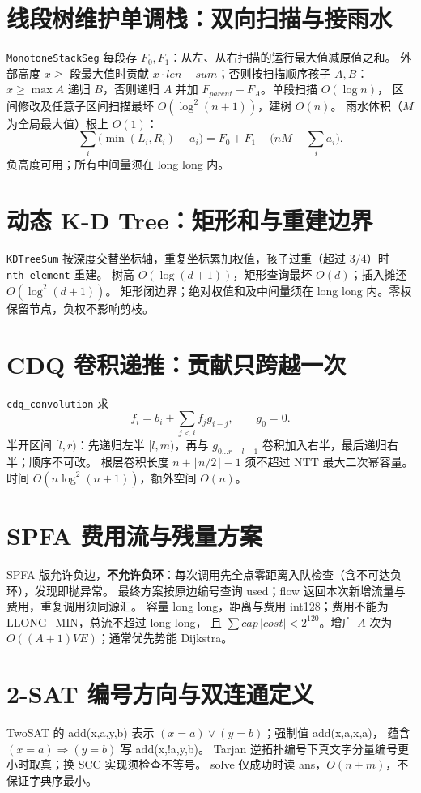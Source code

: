 \section{线段树维护单调栈：双向扫描与接雨水}\label{knowledge-seg-stack}
\texttt{MonotoneStackSeg} 每段存 $F_0,F_1$：从左、从右扫描的运行最大值减原值之和。
外部高度 $x\ge$ 段最大值时贡献 $x\cdot len-sum$；否则按扫描顺序孩子 $A,B$：
$x\ge\max A$ 递归 $B$，否则递归 $A$ 并加 $F_{parent}-F_A$。单段扫描 $O(\log n)$，
区间修改及任意子区间扫描最坏 $O(\log^2(n+1))$，建树 $O(n)$。
雨水体积（$M$ 为全局最大值）根上 $O(1)$：
\[
\sum_i\bigl(\min(L_i,R_i)-a_i\bigr)
=F_0+F_1-\bigl(nM-\sum_i a_i\bigr).
\]
负高度可用；所有中间量须在 long long 内。

\section{动态 K-D Tree：矩形和与重建边界}\label{knowledge-kdt-sum}
\texttt{KDTreeSum} 按深度交替坐标轴，重复坐标累加权值，孩子过重（超过 $3/4$）时 \texttt{nth\_element} 重建。
树高 $O(\log(d+1))$，矩形查询最坏 $O(d)$；插入摊还 $O(\log^2(d+1))$。
矩形闭边界；绝对权值和及中间量须在 long long 内。零权保留节点，负权不影响剪枝。

\section{CDQ 卷积递推：贡献只跨越一次}\label{knowledge-cdq-conv}
\texttt{cdq\_convolution} 求
\[
f_i=b_i+\sum_{j<i}f_j g_{i-j},\qquad g_0=0.
\]
半开区间 $[l,r)$：先递归左半 $[l,m)$，再与 $g_{0\ldots r-l-1}$ 卷积加入右半，最后递归右半；顺序不可改。
根层卷积长度 $n+\lfloor n/2\rfloor-1$ 须不超过 NTT 最大二次幂容量。
时间 $O(n\log^2(n+1))$，额外空间 $O(n)$。

\section{SPFA 费用流与残量方案}\label{knowledge-spfa-cost}
SPFA 版允许负边，\textbf{不允许负环}：每次调用先全点零距离入队检查（含不可达负环），发现即抛异常。
最终方案按原边编号查询 used；flow 返回本次新增流量与费用，重复调用须同源汇。
容量 long long，距离与费用 int128；费用不能为 LLONG\_MIN，总流不超过 long long，
且 $\sum cap\,|cost|<2^{120}$。增广 $A$ 次为 $O((A+1)VE)$；通常优先势能 Dijkstra。

\section{2-SAT 编号方向与双连通定义}\label{knowledge-twosat-bcc}
TwoSAT 的 add(x,a,y,b) 表示 $(x=a)\lor(y=b)$；强制值 add(x,a,x,a)，
蕴含 $(x=a)\Rightarrow(y=b)$ 写 add(x,!a,y,b)。
Tarjan 逆拓扑编号下真文字分量编号更小时取真；换 SCC 实现须检查不等号。
solve 仅成功时读 ans，$O(n+m)$，不保证字典序最小。

